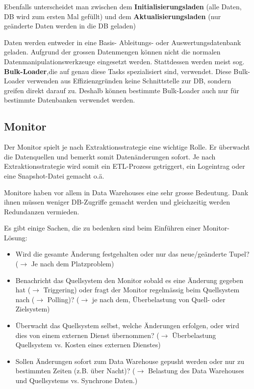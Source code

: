 \documentclass[a4paper, 11pt, nofootinbib]{article}
\begin{document}
Ebenfalls unterscheidet man zwischen dem \textbf{Initialisierungsladen} (alle Daten, DB wird zum ersten Mal gefüllt) und dem \textbf{Aktualisierungsladen} (nur geänderte Daten werden in die DB geladen)

Daten werden entweder in eine Basis- Ableitungs- oder Auswertungsdatenbank geladen. Aufgrund der grossen Datenmengen können nicht die normalen Datenmanipulationswerkzeuge eingesetzt werden. Stattdessen werden meist sog. \textbf{Bulk-Loader},die auf genau diese Tasks spezialisiert sind, verwendet. Diese Bulk-Loader verwenden aus Effizienzgründen keine Schnittstelle zur DB, sondern greifen direkt darauf zu. Deshalb können bestimmte Bulk-Loader auch nur für bestimmte Datenbanken verwendet werden. 

\subsection{Monitor}
Der Monitor spielt je nach Extraktionsstrategie eine wichtige Rolle. Er überwacht die Datenquellen und bemerkt somit Datenänderungen sofort. Je nach Extraktionsstrategie wird somit ein ETL-Prozess getriggert, ein Logeintrag oder eine Snapshot-Datei gemacht o.ä. 

Monitore haben vor allem in Data Warehouses eine sehr grosse Bedeutung. Dank ihnen müssen weniger DB-Zugriffe gemacht werden und gleichzeitig werden Redundanzen vermieden.

\vspace{10px}

\noindent Es gibt einige Sachen, die zu bedenken sind beim Einführen einer Monitor-Lösung:
\begin{itemize}
	\item Wird die gesamte Änderung festgehalten oder nur das neue/geänderte Tupel? ($\rightarrow$ Je nach dem Platzproblem)
	\item Benachricht das Quellsystem den Monitor sobald es eine Änderung gegeben hat ($\rightarrow$ Triggering) oder fragt der Monitor regelmässig beim Quellsystem nach ($\rightarrow$ Polling)? ($\rightarrow$ je nach dem, Überbelastung von Quell- oder Zielsystem)
	\item Überwacht das Quellsystem selbst, welche Änderungen erfolgen, oder wird dies von einem externen Dienst übernommen? ($\rightarrow$ Überbelastung Quellsystem vs. Kosten eines externen Dienstes)
	\item Sollen Änderungen sofort zum Data Warehouse gepusht werden oder nur zu bestimmten Zeiten (z.B. über Nacht)? ($\rightarrow$ Belastung des Data Warehouses und Quellsystems vs. Synchrone Daten.)
	
\end{itemize}
\end{document}

